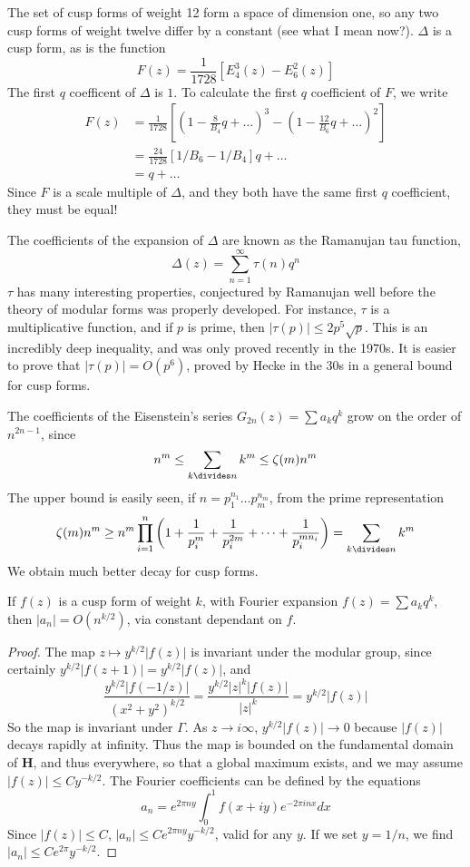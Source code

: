 The set of cusp forms of weight 12 form a space of dimension one, so any two cusp forms of weight twelve differ by a constant (see what I mean now?). $\Delta$ is a cusp form, as is the function
%
\[ F(z) = \frac{1}{1728} [E_4^3(z) - E_6^2(z)] \]
%
The first $q$ coefficent of $\Delta$ is $1$. To calculate the first $q$ coefficient of $F$, we write
%
\begin{align*}
    F(z) &= \frac{1}{1728} \left[\left(1 - \frac{8}{B_4} q + \dots \right)^3 - \left(1 - \frac{12}{B_6} q + \dots \right)^2 \right]\\
    &= \frac{24}{1728} [1/B_6 - 1/B_4] q + \dots\\
    &= q + \dots
\end{align*}
%
Since $F$ is a scale multiple of $\Delta$, and they both have the same first $q$ coefficient, they must be equal!

The coefficients of the expansion of $\Delta$ are known as the Ramanujan tau function,
%
\[ \Delta(z) = \sum_{n = 1}^\infty \tau(n) q^n \]
%
$\tau$ has many interesting properties, conjectured by Ramanujan well before the theory of modular forms was properly developed. For instance, $\tau$ is a multiplicative function, and if $p$ is prime, then $|\tau(p)| \leq 2p^5 \sqrt{p}$. This is an incredibly deep inequality, and was only proved recently in the 1970s. It is easier to prove that $|\tau(p)| = O(p^6)$, proved by Hecke in the 30s in a general bound for cusp forms.

The coefficients of the Eisenstein's series $G_{2n}(z) = \sum a_k q^k$ grow on the order of $n^{2n-1}$, since
%
\[ n^m \leq \sum_{k \divides n} k^m \leq \zeta(m) n^m \]
%
The upper bound is easily seen, if $n = p_1^{n_1} \dots p_m^{n_m}$, from the prime representation
%
\[ \zeta(m) n^m \geq n^m \prod_{i = 1}^n \left(1 + \frac{1}{p_i^m} + \frac{1}{p_i^{2m}} + \dots + \frac{1}{p_i^{m n_i}} \right) = \sum_{k \divides n} k^m \]
%
We obtain much better decay for cusp forms.

\begin{theorem}
    If $f(z)$ is a cusp form of weight $k$, with Fourier expansion $f(z) = \sum a_k q^k$, then $|a_n| = O(n^{k/2})$, via  constant dependant on $f$.
\end{theorem}
\begin{proof}
    The map $z \mapsto y^{k/2} |f(z)|$ is invariant under the modular group, since certainly $y^{k/2} |f(z + 1)| = y^{k/2} |f(z)|$, and
    \[ \frac{y^{k/2} |f(-1/z)|}{(x^2 + y^2)^{k/2}} = \frac{y^{k/2} |z|^k |f(z)|}{|z|^k} = y^{k/2} |f(z)| \]
    So the map is invariant under $\Gamma$. As $z \to i \infty$, $y^{k/2} |f(z)| \to 0$ because $|f(z)|$ decays rapidly at infinity. Thus the map is bounded on the fundamental domain of $\mathbf{H}$, and thus everywhere, so that a global maximum exists, and we may assume $|f(z)| \leq C y^{-k/2}$. The Fourier coefficients can be defined by the equations
    \[ a_n = e^{2 \pi n y} \int_0^1 f(x + iy) e^{-2 \pi i n x} dx \]
    Since $|f(z)| \leq C$, $|a_n| \leq C e^{2 \pi n y} y^{-k/2}$, valid for any $y$. If we set $y = 1/n$, we find $|a_n| \leq C e^{2 \pi} y^{-k/2}$.
\end{proof}

